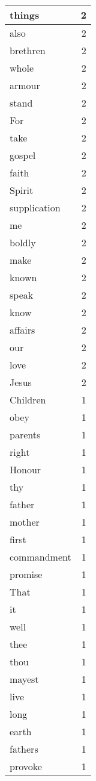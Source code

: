 \begin{center}
\begin{longtable}{l|r}
things & 2\\ \hline 
also & 2\\ \hline 
brethren & 2\\ \hline 
whole & 2\\ \hline 
armour & 2\\ \hline 
stand & 2\\ \hline 
For & 2\\ \hline 
take & 2\\ \hline 
gospel & 2\\ \hline 
faith & 2\\ \hline 
Spirit & 2\\ \hline 
supplication & 2\\ \hline 
me & 2\\ \hline 
boldly & 2\\ \hline 
make & 2\\ \hline 
known & 2\\ \hline 
speak & 2\\ \hline 
know & 2\\ \hline 
affairs & 2\\ \hline 
our & 2\\ \hline 
love & 2\\ \hline 
Jesus & 2\\ \hline 
Children & 1\\ \hline 
obey & 1\\ \hline 
parents & 1\\ \hline 
right & 1\\ \hline 
Honour & 1\\ \hline 
thy & 1\\ \hline 
father & 1\\ \hline 
mother & 1\\ \hline 
first & 1\\ \hline 
commandment & 1\\ \hline 
promise & 1\\ \hline 
That & 1\\ \hline 
it & 1\\ \hline 
well & 1\\ \hline 
thee & 1\\ \hline 
thou & 1\\ \hline 
mayest & 1\\ \hline 
live & 1\\ \hline 
long & 1\\ \hline 
earth & 1\\ \hline 
fathers & 1\\ \hline 
provoke & 1\\ \hline 

\end{longtable}
\end{center}
